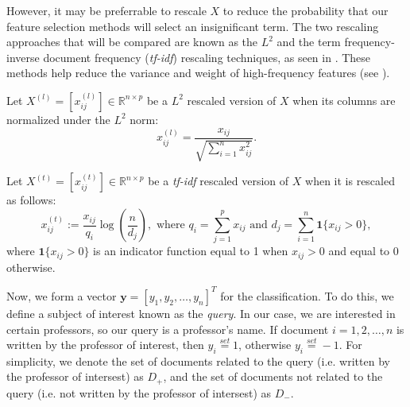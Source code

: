 \documentclass{article}
\begin{document}
However, it may be preferrable to rescale $X$ to reduce the probability that our feature selection methods will select an insignificant term. The two rescaling approaches that will be compared are known as the \emph{$L^2$} and the term frequency-inverse document frequency (\emph{tf-idf}) rescaling techniques, as seen in \cite{elghaoui_1}. These methods help reduce the variance and weight of high-frequency features (see \cite{Monroe}).

Let $X^{(l)}=[x_{ij}^{(l)}]\in \mathbb{R}^{n \times p}$ be a $L^2$ rescaled version of $X$ when its columns are normalized under the $L^2$ norm:
\begin{equation}
x_{ij}^{(l)}=\frac{x_{ij}}{\sqrt{\sum_{i=1}^n x_{ij}^2}}.
\end{equation}

Let $X^{(t)}=[x_{ij}^{(t)}]\in \mathbb{R}^{n \times p}$ be a \emph{tf-idf} rescaled version of $X$ when it is rescaled as follows:
\begin{equation}
x_{ij}^{(t)}:=\frac{x_{ij}}{q_i} \log(\frac{n}{d_j}), \text{ where } q_i=\sum_{j=1}^p x_{ij} \text{ and }d_j=\sum_{i=1}^n \textbf{1}\{x_{ij}>0\},
\end{equation}
where $\textbf{1}\{x_{ij}>0\}$ is an indicator function equal to 1 when $x_{ij}>0$ and equal to $0$ otherwise.

Now, we form a vector $\textbf{y}=[y_1, y_2, \ldots, y_n]^T$ for the classification. To do this, we define a subject of interest known as the \emph{query}. In our case, we are interested in certain professors, so our query is a professor's name. If document $i=1, 2, \ldots, n$ is written by the professor of interest, then $y_i\overset{set}{=}1$, otherwise $y_i\overset{set}{=}-1$. For simplicity, we denote the set of documents related to the query (i.e. written by the professor of intersest) as $D_+$, and the set of documents not related to the query (i.e. not written by the professor of intersest) as $D_-$.
\end{document}
